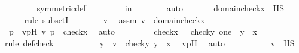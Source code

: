 \begin{isabellebody}
\ \ \ \ \ \ \isamarkupfalse%
\ symmetric{\isacharunderscore}{\kern0pt}def\ \isanewline
\ \ \ \ \ \ \isamarkupfalse%
\ {\isasymG}{\isacharunderscore}{\kern0pt}in{\isacharunderscore}{\kern0pt}{\isasymF}\isanewline
\ \ \ \ \ \ \isamarkupfalse%
\ auto\ \isanewline
\ \ \ \ \isamarkupfalse%
\ {\isachardoublequoteopen}domain{\isacharparenleft}{\kern0pt}check{\isacharparenleft}{\kern0pt}x{\isacharparenright}{\kern0pt}{\isacharparenright}{\kern0pt}\ {\isasymsubseteq}\ HS{\isachardoublequoteclose}\ \isanewline
\ \ \ \ \isamarkupfalse%
{\isacharparenleft}{\kern0pt}rule\ subsetI{\isacharparenright}{\kern0pt}\isanewline
\ \ \ \ \ \ \isamarkupfalse%
\ v\ \isamarkupfalse%
\ assm{}{\isacharcolon}{\kern0pt}\ {\isachardoublequoteopen}v\ {\isasymin}\ domain{\isacharparenleft}{\kern0pt}check{\isacharparenleft}{\kern0pt}x{\isacharparenright}{\kern0pt}{\isacharparenright}{\kern0pt}{\isachardoublequoteclose}\ \isanewline
\ \ \ \ \ \ \isamarkupfalse%
\ \isamarkupfalse%
\ p\ \ vpH{\isacharcolon}{\kern0pt}\ {\isachardoublequoteopen}{\isacharless}{\kern0pt}v{\isacharcomma}{\kern0pt}\ p{\isachargreater}{\kern0pt}\ {\isasymin}\ check{\isacharparenleft}{\kern0pt}x{\isacharparenright}{\kern0pt}{\isachardoublequoteclose}\ \isamarkupfalse%
\ auto\ \isanewline
\ \ \ \ \ \ \isamarkupfalse%
\ {\isachardoublequoteopen}check{\isacharparenleft}{\kern0pt}x{\isacharparenright}{\kern0pt}\ {\isacharequal}{\kern0pt}\ {\isacharbraceleft}{\kern0pt}\ {\isacharless}{\kern0pt}check{\isacharparenleft}{\kern0pt}y{\isacharparenright}{\kern0pt}{\isacharcomma}{\kern0pt}\ one{\isachargreater}{\kern0pt}\ {\isachardot}{\kern0pt}\ y\ {\isasymin}\ x\ {\isacharbraceright}{\kern0pt}{\isachardoublequoteclose}\ \isamarkupfalse%
{\isacharparenleft}{\kern0pt}rule\ def{\isacharunderscore}{\kern0pt}check{\isacharparenright}{\kern0pt}\ \isanewline
\ \ \ \ \ \ \isamarkupfalse%
\ \isamarkupfalse%
\ y\ \ {\isachardoublequoteopen}v\ {\isacharequal}{\kern0pt}\ check{\isacharparenleft}{\kern0pt}y{\isacharparenright}{\kern0pt}{\isachardoublequoteclose}\ {\isachardoublequoteopen}y\ {\isasymin}\ x{\isachardoublequoteclose}\ \isamarkupfalse%
\ vpH\ \isamarkupfalse%
\ auto\ \isanewline
\ \ \ \ \ \ \isamarkupfalse%
\ \isamarkupfalse%
\ {\isachardoublequoteopen}v\ {\isasymin}\ HS{\isachardoublequoteclose}\ \isamarkupfalse%

\end{isabellebody}
